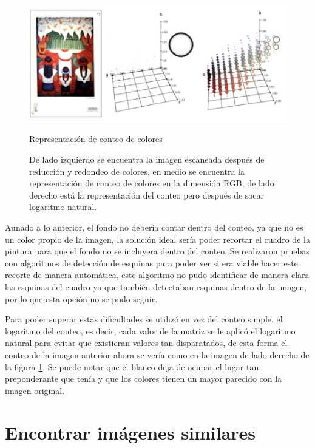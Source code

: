 \begin{figure}[H]
\centering
\includegraphics[width=1\textwidth]{Figures/conteo_colores.jpg}
\caption{Representación de conteo de colores}
\caption*{De lado izquierdo se encuentra la imagen escaneada después de reducción y redondeo de colores, en medio se encuentra la representación de conteo de colores en la dimensión RGB, de lado derecho está la representación del conteo pero después de sacar logaritmo natural.}
\label{fig:conteo-colores}
\end{figure}


Aunado a lo anterior, el fondo no debería contar dentro del conteo, ya que no es un color propio de la imagen, la solución ideal sería poder recortar el cuadro de la pintura para que el fondo no se incluyera dentro del conteo. Se realizaron pruebas con algoritmos de detección de esquinas para poder ver si era viable hacer este recorte de manera automática, este algoritmo no pudo identificar de manera clara las esquinas del cuadro ya que también detectaban esquinas dentro de la imagen, por lo que esta opción no se pudo seguir.

Para poder superar estas dificultades se utilizó en vez del conteo simple, el logaritmo del conteo, es decir, cada valor de la matriz se le aplicó el logaritmo natural para evitar que existieran valores tan disparatados, de esta forma el conteo de la imagen anterior ahora se vería como en la imagen de lado derecho de la figura \ref{fig:conteo-colores}. Se puede notar que el blanco deja de ocupar el lugar tan preponderante que tenía y que los colores tienen un mayor parecido con la imagen original.

\section{Encontrar imágenes similares}

